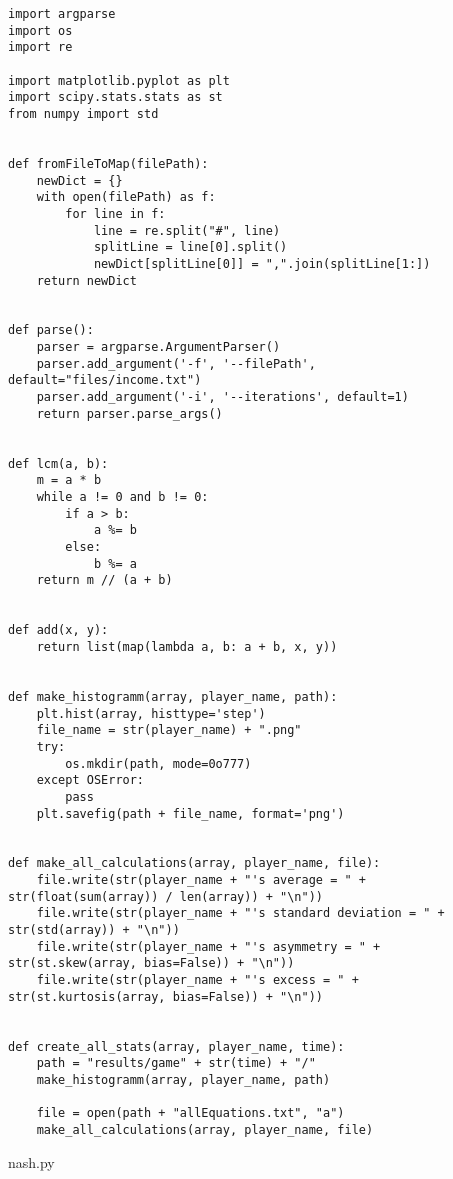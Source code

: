  \begin{lstlisting}[style=fsharpstyle]
import argparse
import os
import re

import matplotlib.pyplot as plt
import scipy.stats.stats as st
from numpy import std


def fromFileToMap(filePath):
    newDict = {}
    with open(filePath) as f:
        for line in f:
            line = re.split("#", line)
            splitLine = line[0].split()
            newDict[splitLine[0]] = ",".join(splitLine[1:])
    return newDict


def parse():
    parser = argparse.ArgumentParser()
    parser.add_argument('-f', '--filePath', default="files/income.txt")
    parser.add_argument('-i', '--iterations', default=1)
    return parser.parse_args()


def lcm(a, b):
    m = a * b
    while a != 0 and b != 0:
        if a > b:
            a %= b
        else:
            b %= a
    return m // (a + b)


def add(x, y):
    return list(map(lambda a, b: a + b, x, y))


def make_histogramm(array, player_name, path):
    plt.hist(array, histtype='step')
    file_name = str(player_name) + ".png"
    try:
        os.mkdir(path, mode=0o777)
    except OSError:
        pass
    plt.savefig(path + file_name, format='png')


def make_all_calculations(array, player_name, file):
    file.write(str(player_name + "'s average = " + str(float(sum(array)) / len(array)) + "\n"))
    file.write(str(player_name + "'s standard deviation = " + str(std(array)) + "\n"))
    file.write(str(player_name + "'s asymmetry = " + str(st.skew(array, bias=False)) + "\n"))
    file.write(str(player_name + "'s excess = " + str(st.kurtosis(array, bias=False)) + "\n"))


def create_all_stats(array, player_name, time):
    path = "results/game" + str(time) + "/"
    make_histogramm(array, player_name, path)

    file = open(path + "allEquations.txt", "a")
    make_all_calculations(array, player_name, file)

 \end{lstlisting}
 nash.py

